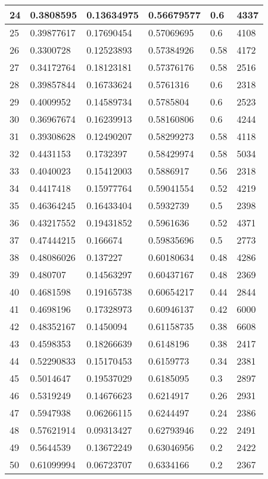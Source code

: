 \begin{longtable}{|l|l|l|l|l|l|}
24 & 0.3808595 & 0.13634975 & 0.56679577 & 0.6 & 4337 \\ \hline 
25 & 0.39877617 & 0.17690454 & 0.57069695 & 0.6 & 4108 \\ \hline 
26 & 0.3300728 & 0.12523893 & 0.57384926 & 0.58 & 4172 \\ \hline 
27 & 0.34172764 & 0.18123181 & 0.57376176 & 0.58 & 2516 \\ \hline 
28 & 0.39857844 & 0.16733624 & 0.5761316 & 0.6 & 2318 \\ \hline 
29 & 0.4009952 & 0.14589734 & 0.5785804 & 0.6 & 2523 \\ \hline 
30 & 0.36967674 & 0.16239913 & 0.58160806 & 0.6 & 4244 \\ \hline 
31 & 0.39308628 & 0.12490207 & 0.58299273 & 0.58 & 4118 \\ \hline 
32 & 0.4431153 & 0.1732397 & 0.58429974 & 0.58 & 5034 \\ \hline 
33 & 0.4040023 & 0.15412003 & 0.5886917 & 0.56 & 2318 \\ \hline 
34 & 0.4417418 & 0.15977764 & 0.59041554 & 0.52 & 4219 \\ \hline 
35 & 0.46364245 & 0.16433404 & 0.5932739 & 0.5 & 2398 \\ \hline 
36 & 0.43217552 & 0.19431852 & 0.5961636 & 0.52 & 4371 \\ \hline 
37 & 0.47444215 & 0.166674 & 0.59835696 & 0.5 & 2773 \\ \hline 
38 & 0.48086026 & 0.137227 & 0.60180634 & 0.48 & 4286 \\ \hline 
39 & 0.480707 & 0.14563297 & 0.60437167 & 0.48 & 2369 \\ \hline 
40 & 0.4681598 & 0.19165738 & 0.60654217 & 0.44 & 2844 \\ \hline 
41 & 0.4698196 & 0.17328973 & 0.60946137 & 0.42 & 6000 \\ \hline 
42 & 0.48352167 & 0.1450094 & 0.61158735 & 0.38 & 6608 \\ \hline 
43 & 0.4598353 & 0.18266639 & 0.6148196 & 0.38 & 2417 \\ \hline 
44 & 0.52290833 & 0.15170453 & 0.6159773 & 0.34 & 2381 \\ \hline 
45 & 0.5014647 & 0.19537029 & 0.6185095 & 0.3 & 2897 \\ \hline 
46 & 0.5319249 & 0.14676623 & 0.6214917 & 0.26 & 2931 \\ \hline 
47 & 0.5947938 & 0.06266115 & 0.6244497 & 0.24 & 2386 \\ \hline 
48 & 0.57621914 & 0.09313427 & 0.62793946 & 0.22 & 2491 \\ \hline 
49 & 0.5644539 & 0.13672249 & 0.63046956 & 0.2 & 2422 \\ \hline 
50 & 0.61099994 & 0.06723707 & 0.6334166 & 0.2 & 2367 \\ \hline 
\end{longtable}